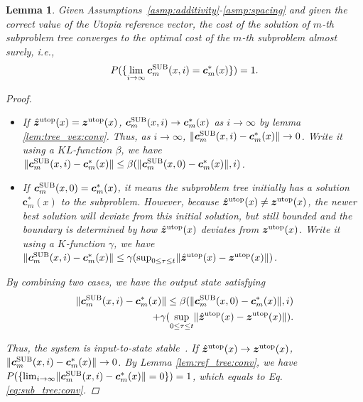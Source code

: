 \documentclass{article}
\newtheorem{lem}{Lemma}
\begin{document}
\begin{lem}
\label{lem:sub_tree:conv}
Given Assumptions~\ref{asmp:additivity}-\ref{asmp:spacing} and given the correct value of the Utopia reference vector,
the cost of the solution of $ m $-th subproblem tree converges to the optimal cost of the $ m $-th subproblem almost surely, i.e.,
\begin{equation}
\label{eq:sub_tree:conv}
P( \{ \lim_{ i \rightarrow \infty } \bm{c}^{\rm SUB}_{m} ( x ,i ) =  \bm{c}_{m}^{*} (x) \} ) = 1 .
\end{equation}
\begin{proof}

\begin{itemize}
\item If $ \hat{\bm{z}}^{\rm utop}  (x) = \bm{z}^{\rm utop}  (x) $, $ \bm{c}^{\rm SUB}_{m} ( x ,i ) \rightarrow \bm{c}_{m}^{*} (x) $ as $ i \rightarrow \infty $ by lemma \ref{lem:tree_vex:conv}.
Thus, as $ i \rightarrow \infty $, $ \lVert \bm{c}^{\rm SUB}_{m} ( x ,i ) - \bm{c}_{m}^{*} (x) \rVert \rightarrow 0 $.
Write it using a $ KL $-function $ \beta $, we have
$ \lVert \bm{c}^{\rm SUB}_{m} ( x ,i ) - \bm{c}_{m}^{*} (x) \rVert \leq \beta( \lVert \bm{c}^{\rm SUB}_{m} ( x , 0 ) - \bm{c}_{m}^{*} (x) \rVert , i )  $.
\item If $ \bm{c}^{\rm SUB}_{m} ( x , 0 ) = \bm{c}_{m}^{*} (x) $, it means the subproblem tree initially has a solution $ \bm{c}_{m}^{*} (x) $ to the subproblem.
However, because $  \hat{\bm{z}}^{\rm utop}  (x) \neq \bm{z}^{\rm utop}  (x)  $, the newer best solution will deviate from this initial solution, but still bounded and the boundary is determined by how  $ \hat{\bm{z}}^{\rm utop}  (x) $ deviates from $  \bm{z}^{\rm utop}  (x)  $.
Write it using a $ K $-function $ \gamma $, we have
$ \lVert \bm{c}^{\rm SUB}_{m} ( x ,i ) - \bm{c}_{m}^{*} (x) \rVert \leq \gamma ( \sup_{ 0 \leq \tau \leq t}  \lVert \hat{\bm{z}}^{\rm utop}  (x) - \bm{z}^{\rm utop}  (x) \rVert ) $.
\end{itemize}
By combining two cases, we have the output state satisfying 
\begin{equation}
\begin{aligned}
\lVert \bm{c}^{\rm SUB}_{m} ( x ,i ) - \bm{c}_{m}^{*} (x) \rVert \leq \beta( \lVert \bm{c}^{\rm SUB}_{m} ( x , 0 ) - \bm{c}_{m}^{*} (x) \rVert , i ) 
\\ + \gamma ( \sup_{ 0 \leq \tau \leq t}  \lVert \hat{\bm{z}}^{\rm utop}  (x) - \bm{z}^{\rm utop}  (x) \rVert ).
\end{aligned}
\end{equation}

Thus, the system is input-to-state stable~\cite{khalil1996nonlinear}.
If $ \hat{\bm{z}}^{\rm utop}  (x) \rightarrow \bm{z}^{\rm utop} (x) $,
$ \lVert \bm{c}^{\rm SUB}_{m} ( x ,i ) - \bm{c}_{m}^{*} (x) \rVert \rightarrow 0 $.
By Lemma \ref{lem:ref_tree:conv}, we have
$ P( \{ \lim_{ i \rightarrow \infty }  \lVert \bm{c}^{\rm SUB}_{m} ( x ,i ) - \bm{c}_{m}^{*} (x) \rVert = 0 \} ) = 1 $, 
which equals to Eq. \eqref{eq:sub_tree:conv}.
\end{proof}
\end{lem}
\end{document}
